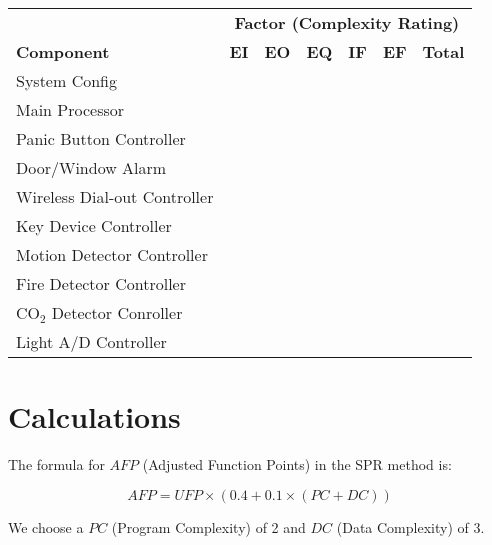 \documentclass[11pt]{article}
\begin{document}
\begin{center}
  \begin{tabular}[h]{lllllll}
                                 & \multicolumn{6}{c}{\bf Factor (Complexity Rating)}                 \\
    {\bf Component}              & {\bf EI} & {\bf EO} & {\bf EQ} & {\bf IF} & {\bf EF} & {\bf Total} \\
    \hline \hline
    System Config                &          &          &          &          &          &             \\
    Main Processor               &          &          &          &          &          &             \\
    Panic Button Controller      &          &          &          &          &          &             \\
    Door/Window Alarm            &          &          &          &          &          &             \\
    Wireless Dial-out Controller &          &          &          &          &          &             \\
    Key Device Controller        &          &          &          &          &          &             \\
    Motion Detector Controller   &          &          &          &          &          &             \\
    Fire Detector Controller     &          &          &          &          &          &             \\
    CO$_2$ Detector Conroller    &          &          &          &          &          &             \\
    Light A/D Controller         &          &          &          &          &          & 
  \end{tabular}
\end{center}

\section{Calculations}

The formula for $AFP$ (Adjusted Function Points) in the SPR method is:

\begin{equation}
  AFP = UFP \times (0.4 + 0.1 \times (PC + DC))
\end{equation}

We choose a $PC$ (Program Complexity) of 2 and $DC$ (Data Complexity) of 3.
\end{document}
